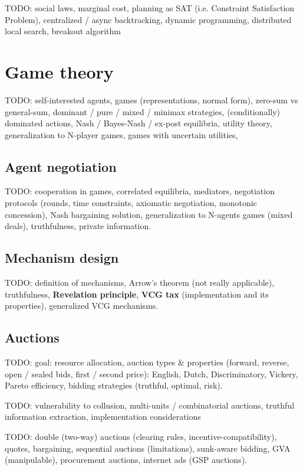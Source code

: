 \documentclass[10pt,a4paper,landscape]{article}
\begin{document}
\begin{multicols*}{4}
TODO: social laws, marginal cost, planning as SAT (i.e. Constraint Satisfaction Problem), centralized / async backtracking, dynamic programming, distributed local search, breakout algorithm

\section{Game theory}

TODO: self-interested agents, games (representations, normal form), zero-sum vs general-sum, dominant / pure / mixed / minimax strategies, (conditionally) dominated actions, Nash / Bayes-Nash / ex-post equilibria, utility theory, generalization to N-player games, games with uncertain utilities,

\subsection{Agent negotiation}

TODO: cooperation in games, correlated equilibria, mediators, negotiation protocols (rounds, time constraints, axiomatic negotiation, monotonic concession), Nash bargaining solution, generalization to N-agents games (mixed deals), truthfulness, private information.

\subsection{Mechanism design}

TODO: definition of mechanisms, Arrow's theorem (not really applicable), truthfulness, \textbf{Revelation principle}, \textbf{VCG tax} (implementation and its properties), generalized VCG mechanisms.

\subsection{Auctions}

TODO: goal: resource allocation, auction types \& properties (forward, reverse, open / sealed bids, first / second price): English, Dutch, Discriminatory, Vickery, Pareto efficiency, bidding strategies (truthful, optimal, risk).

TODO: vulnerability to collusion, multi-units / combinatorial  auctions, truthful information extraction, implementation considerations

TODO: double (two-way) auctions (clearing rules, incentive-compatibility), quotes, bargaining, sequential auctions (limitations), sunk-aware bidding, GVA (manipulable), procurement auctions, internet ads (GSP auctions).


\end{multicols*}
\end{document}
